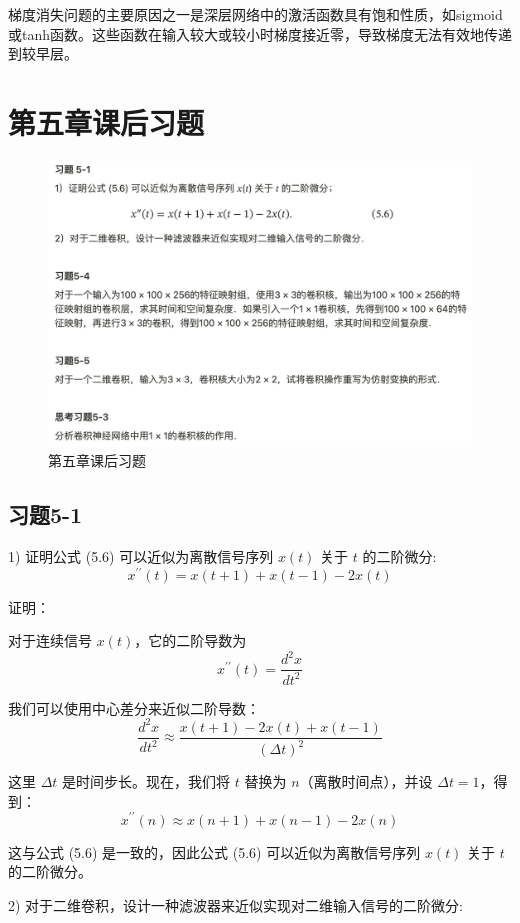 \documentclass[]{article}
\begin{document}
梯度消失问题的主要原因之一是深层网络中的激活函数具有饱和性质，如sigmoid或tanh函数。这些函数在输入较大或较小时梯度接近零，导致梯度无法有效地传递到较早层。

\section{第五章课后习题}

\begin{figure}[H]
	\centering
	\includegraphics[width=1\linewidth]{第五章课后习题}
	\caption{第五章课后习题}
	\label{fig:}
\end{figure}

\subsection{习题5-1}
1) 证明公式 (5.6) 可以近似为离散信号序列 \(x(t)\) 关于 \(t\) 的二阶微分:
\[ x^{\prime \prime}(t) = x(t+1) + x(t-1) - 2x(t) \]

证明：

对于连续信号 \(x(t)\)，它的二阶导数为
\[ x^{\prime \prime}(t) = \frac{d^2x}{dt^2} \]

我们可以使用中心差分来近似二阶导数：
\[ \frac{d^2x}{dt^2} \approx \frac{x(t+1) - 2x(t) + x(t-1)}{(\Delta t)^2} \]

这里 \(\Delta t\) 是时间步长。现在，我们将 \(t\) 替换为 \(n\)（离散时间点），并设 \(\Delta t = 1\)，得到：
\[ x^{\prime \prime}(n) \approx x(n+1) + x(n-1) - 2x(n) \]

这与公式 (5.6) 是一致的，因此公式 (5.6) 可以近似为离散信号序列 \(x(t)\) 关于 \(t\) 的二阶微分。


2) 对于二维卷积，设计一种滤波器来近似实现对二维输入信号的二阶微分:
\end{document}
